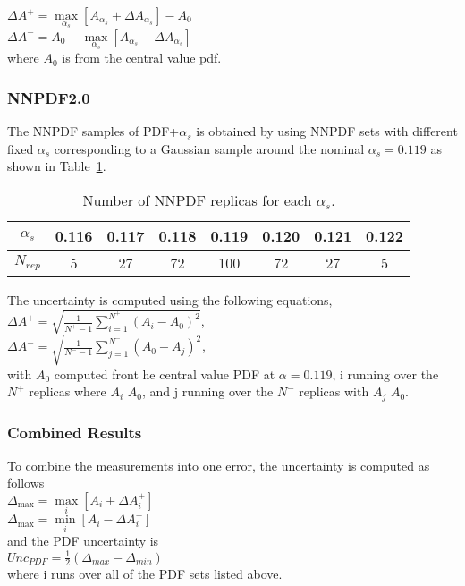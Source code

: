 $\Delta A^{+} = \underset{\alpha _s}{\max} [ A_{\alpha _ s} + \Delta A_{\alpha _s} ]  - A_0  $ \\
$\Delta A^{-} = A_0 -  \underset{\alpha _s}{\max} [ A_{\alpha _ s} - \Delta A_{\alpha _s} ] $ \\

where $A_0$ is from the central value pdf.\\

\subsubsection{NNPDF2.0}
The NNPDF samples of PDF+$\alpha _s$ is obtained by using NNPDF sets with different fixed $\alpha _s$ corresponding to a Gaussian sample around the nominal $\alpha _s = 0.119$ as shown in Table~\ref{tab:nnpdfsets}.
 
\begin{table}[h]
\begin{center}
\caption{\small\label{tab:nnpdfsets} Number of NNPDF replicas for each $\alpha _s$.}
\begin{tabular}{c|ccccccc}\hline
$\alpha _s$         &  0.116 & 0.117 & 0.118 & 0.119 & 0.120 & 0.121 & 0.122 \\ \hline
$N_{rep}$                &  5         &  27      &  72      &   100   &  72     &   27    &    5       \\
\hline
\end{tabular}
\end{center}
\end{table}

The uncertainty is computed using the following equations,\\
$\Delta A ^{+} = \sqrt{  \frac{1}{N^{+} - 1} \sum \limits_{i=1}^{N^{+}} (A_i - A_0)^2}$,\\
$\Delta A ^{-} = \sqrt{  \frac{1}{N^{-} - 1} \sum \limits_{j=1}^{N^{-}} (A_0 - A_j)^2}$,\\

with $A_0$ computed front he central value PDF at $\alpha = 0.119$, i running over the $N^{+}$ replicas where $A_i$ \gt $A_0$, and j running over the $N^{-}$ replicas with $A_j$ \lt $A_0$.

\subsubsection{Combined Results}
To combine the measurements into one error, the uncertainty is computed as follows\\
$\Delta _{\max} = \underset{i}{\max}  [A_i + \Delta A^{+} _i]$\\
$\Delta _{\max} = \underset{i}{\min}  [A_i - \Delta A^{-} _i]$\\
and the PDF uncertainty is\\
$ Unc_{PDF} = \frac{1}{2}(\Delta _{max} - \Delta _{min} )$\\
where i runs over all of the PDF sets listed above.\\

